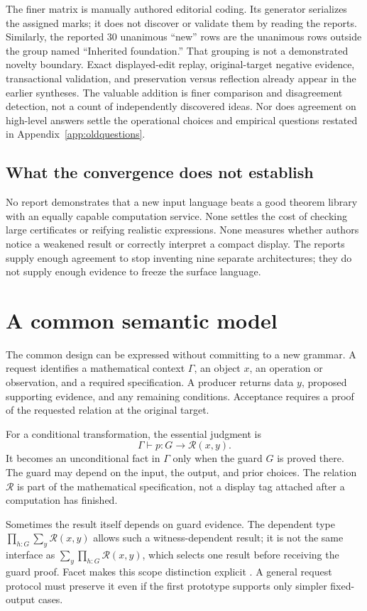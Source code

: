 \documentclass[11pt,letterpaper]{article}
\begin{document}
The finer matrix is manually authored editorial coding. Its generator serializes
the assigned marks; it does not discover or validate them by reading the reports.
Similarly, the reported 30 unanimous ``new'' rows are the unanimous rows outside
the group named ``Inherited foundation.'' That grouping is not a demonstrated
novelty boundary. Exact displayed-edit replay, original-target negative evidence,
transactional validation, and preservation versus reflection already appear in
the earlier syntheses. The
valuable addition is finer comparison and disagreement detection, not a count
of independently discovered ideas. Nor does agreement on high-level answers
settle the operational choices and empirical questions restated in
Appendix~\ref{app:oldquestions}.

\subsection{What the convergence does not establish}
No report demonstrates that a new input language beats a good theorem library
with an equally capable computation service. None settles the cost of checking
large certificates or reifying realistic expressions. None measures whether
authors notice a weakened result or correctly interpret a compact display. The
reports supply enough agreement to stop inventing nine separate architectures;
they do not supply enough evidence to freeze the surface language.

\section{A common semantic model}\label{sec:model}
The common design can be expressed without committing to a new grammar. A
request identifies a mathematical context \(\Gamma\), an object \(x\), an
operation or observation, and a required specification. A producer returns data
\(y\), proposed supporting evidence, and any remaining conditions. Acceptance
requires a proof of the requested relation at the original target.

For a conditional transformation, the essential judgment is
\[
  \Gamma\vdash p : G \longrightarrow \mathcal R(x,y).
\]
It becomes an unconditional fact in \(\Gamma\) only when the guard \(G\) is
proved there. The guard may depend on the input, the output, and prior choices.
The relation \(\mathcal R\) is part of the mathematical specification, not a
display tag attached after a computation has finished.

Sometimes the result itself depends on guard evidence. The dependent type
\(\prod_{h:G}\sum_y\mathcal R(x,y)\) allows such a witness-dependent result;
it is not the same interface as \(\sum_y\prod_{h:G}\mathcal R(x,y)\), which
selects one result before receiving the guard proof. Facet makes this scope
distinction explicit \cite[\S5.2]{facet}. A general request protocol must
preserve it even if the first prototype supports only simpler fixed-output cases.
\end{document}

